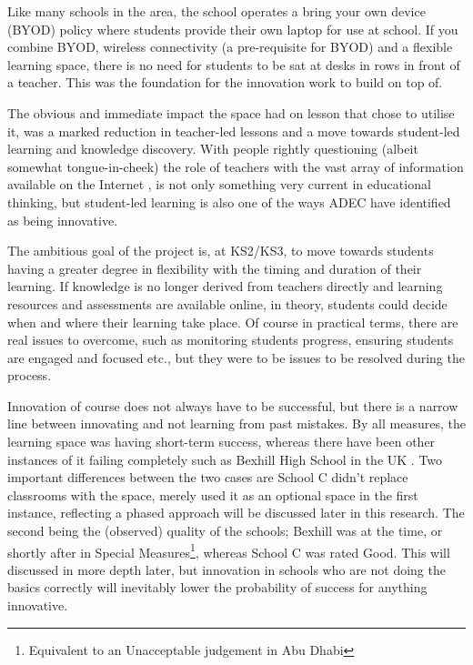 Like many schools in the area, the school operates a bring your own device (BYOD) policy where students provide their own laptop for use at school. If you combine BYOD, wireless connectivity (a pre-requisite for BYOD) and a flexible learning space, there is no need for students to be sat at desks in rows in front of a teacher. This was the foundation for the innovation work to build on top of.

The obvious and immediate impact the space had on lesson that chose to utilise it, was a marked reduction in teacher-led lessons and a move towards student-led learning and knowledge discovery. With people rightly questioning (albeit somewhat tongue-in-cheek) the role of teachers with the vast array of information available on the Internet \cite{gilbert2010need}, is not only something very current in educational thinking, but student-led learning is also one of the ways ADEC have identified as being innovative.

The ambitious goal of the project is, at KS2/KS3, to move towards students having a greater degree in flexibility with the timing and duration of their learning. If knowledge is no longer derived from teachers directly and learning resources and assessments are available online, in theory, students could decide when and where their learning take place. Of course in practical terms, there are real issues to overcome, such as monitoring students progress, ensuring students are engaged and focused etc., but they were to be issues to be resolved during the process.

Innovation of course does not always have to be successful, but there is a narrow line between innovating and not learning from past mistakes. By all measures, the learning space was having short-term success, whereas there have been other instances of it failing completely such as Bexhill High School in the UK \cite{Lusher2015}. Two important differences between the two cases are School C didn't replace classrooms with the space, merely used it as an optional space in the first instance, reflecting a phased approach will be discussed later in this research. The second being the (observed) quality of the schools; Bexhill was at the time, or shortly after in Special Measures\footnote{Equivalent to an Unacceptable judgement in Abu Dhabi}, whereas School C was rated Good. This will discussed in more depth later, but innovation in schools who are not doing the basics correctly will inevitably lower the probability of success for anything innovative.



